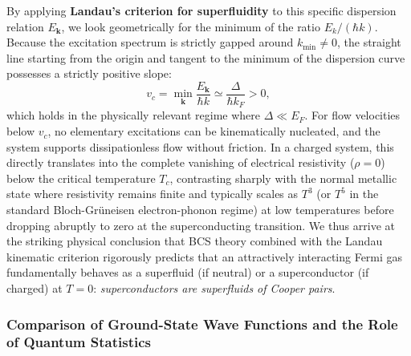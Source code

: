 By applying \textbf{Landau's criterion for superfluidity} to this specific dispersion relation \( E_{\mathbf{k}} \), we look geometrically for the minimum of the ratio \( E_k / (\hbar k) \). Because the excitation spectrum is strictly gapped around \( k_{\text{min}} \neq 0 \), the straight line starting from the origin and tangent to the minimum of the dispersion curve possesses a strictly positive slope:
\[
    v_c = \min_{\mathbf{k}} \frac{E_{\mathbf{k}}}{\hbar k} \simeq \frac{\Delta}{\hbar k_F} > 0,
\]
which holds in the physically relevant regime where \( \Delta \ll E_F \). For flow velocities below \( v_c \), no elementary excitations can be kinematically nucleated, and the system supports dissipationless flow without friction. In a charged system, this directly translates into the complete vanishing of electrical resistivity (\( \rho = 0 \)) below the critical temperature \( T_c \), contrasting sharply with the normal metallic state where resistivity remains finite and typically scales as \( T^3 \) (or \( T^5 \) in the standard Bloch-Grüneisen electron-phonon regime) at low temperatures before dropping abruptly to zero at the superconducting transition. We thus arrive at the striking physical conclusion that BCS theory combined with the Landau kinematic criterion rigorously predicts that an attractively interacting Fermi gas fundamentally behaves as a superfluid (if neutral) or a superconductor (if charged) at \( T = 0 \): \emph{superconductors are superfluids of Cooper pairs}.

\subsubsection{Comparison of Ground-State Wave Functions and the Role of Quantum Statistics}

